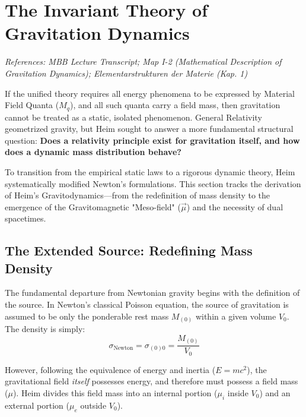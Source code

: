 \documentclass[11pt,a4paper,oneside]{article}
\begin{document}
\section{The Invariant Theory of Gravitation Dynamics}
\label{sec:grav_dynamics}

\textit{References: MBB Lecture Transcript; Map I-2 (Mathematical Description of Gravitation Dynamics); Elementarstrukturen der Materie (Kap. 1)}

If the unified theory requires all energy phenomena to be expressed by Material Field Quanta ($M_q$), and all such quanta carry a field mass, then gravitation cannot be treated as a static, isolated phenomenon. General Relativity geometrized gravity, but Heim sought to answer a more fundamental structural question: \textbf{Does a relativity principle exist for gravitation itself, and how does a dynamic mass distribution behave?}

To transition from the empirical static laws to a rigorous dynamic theory, Heim systematically modified Newton's formulations. This section tracks the derivation of Heim's Gravitodynamics—from the redefinition of mass density to the emergence of the Gravitomagnetic "Meso-field" ($\vec{\mu}$) and the necessity of dual spacetimes.

\subsection{The Extended Source: Redefining Mass Density}

The fundamental departure from Newtonian gravity begins with the definition of the source. In Newton's classical Poisson equation, the source of gravitation is assumed to be only the ponderable rest mass $M_{(0)}$ within a given volume $V_0$. The density is simply:
\begin{equation}
    \sigma_{\text{Newton}} = \sigma_{(0)0} = \frac{M_{(0)}}{V_0}
\end{equation}

However, following the equivalence of energy and inertia ($E=mc^2$), the gravitational field \textit{itself} possesses energy, and therefore must possess a field mass ($\mu$). Heim divides this field mass into an internal portion ($\mu_i$ inside $V_0$) and an external portion ($\mu_e$ outside $V_0$). 
\end{document}
